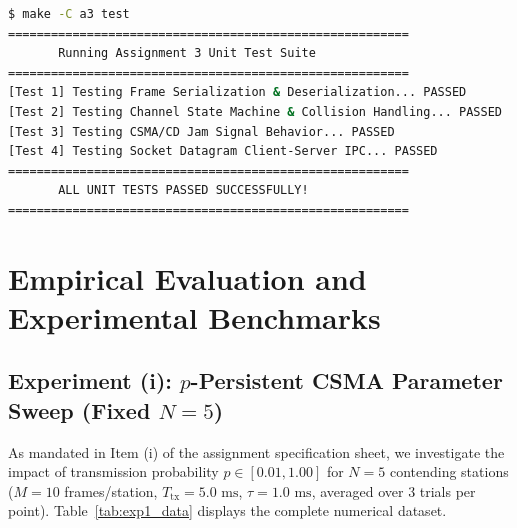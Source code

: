 \documentclass[11pt,a4paper]{article}
\begin{document}
\begin{lstlisting}[language=bash, caption={Console output from the deterministic unit test harness.}]
$ make -C a3 test
========================================================
       Running Assignment 3 Unit Test Suite             
========================================================
[Test 1] Testing Frame Serialization & Deserialization... PASSED
[Test 2] Testing Channel State Machine & Collision Handling... PASSED
[Test 3] Testing CSMA/CD Jam Signal Behavior... PASSED
[Test 4] Testing Socket Datagram Client-Server IPC... PASSED
========================================================
       ALL UNIT TESTS PASSED SUCCESSFULLY!              
========================================================
\end{lstlisting}

\section{Empirical Evaluation and Experimental Benchmarks}

\subsection{Experiment (i): $p$-Persistent CSMA Parameter Sweep (Fixed $N=5$)}
As mandated in Item (i) of the assignment specification sheet, we investigate the impact of transmission probability $p \in [0.01, 1.00]$ for $N = 5$ contending stations ($M = 10$ frames/station, $T_{\text{tx}} = 5.0\text{ ms}$, $\tau = 1.0\text{ ms}$, averaged over 3 trials per point). Table~\ref{tab:exp1_data} displays the complete numerical dataset.
\end{document}
